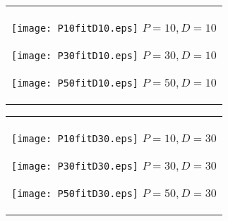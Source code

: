 \documentclass[a4paper,11pt,oneside,openany]{jsbook}
\begin{document}
\begin{figure}[htbp]
  \begin{center}
    \begin{tabular}{c}


      \begin{minipage}{0.33\hsize}
        \begin{center}
          \texttt{[image: P10fitD10.eps]}
          \hspace{1.2cm}$P=10, D=10
$        \end{center}
      \end{minipage}

      \begin{minipage}{0.33\hsize}
        \begin{center}
          \texttt{[image: P30fitD10.eps]}
          \hspace{1.2cm}$P=30, D=10
$        \end{center}
      \end{minipage}

      \begin{minipage}{0.33\hsize}
        \begin{center}
          \texttt{[image: P50fitD10.eps]}
          \hspace{1.2cm}$P=50, D=10
$        \end{center}
      \end{minipage}
    \end{tabular}
  \end{center}
\end{figure}
\begin{figure}[htbp]
  \begin{center}
    \begin{tabular}{c}


      \begin{minipage}{0.33\hsize}
        \begin{center}
          \texttt{[image: P10fitD30.eps]}
          \hspace{1.2cm}$P=10, D=30
$        \end{center}
      \end{minipage}

      \begin{minipage}{0.33\hsize}
        \begin{center}
          \texttt{[image: P30fitD30.eps]}
          \hspace{1.2cm}$P=30, D=30
$        \end{center}
      \end{minipage}

      \begin{minipage}{0.33\hsize}
        \begin{center}
          \texttt{[image: P50fitD30.eps]}
          \hspace{1.2cm}$P=50, D=30
$        \end{center}
      \end{minipage}
    \end{tabular}
  \end{center}
\end{figure}
\end{document}
